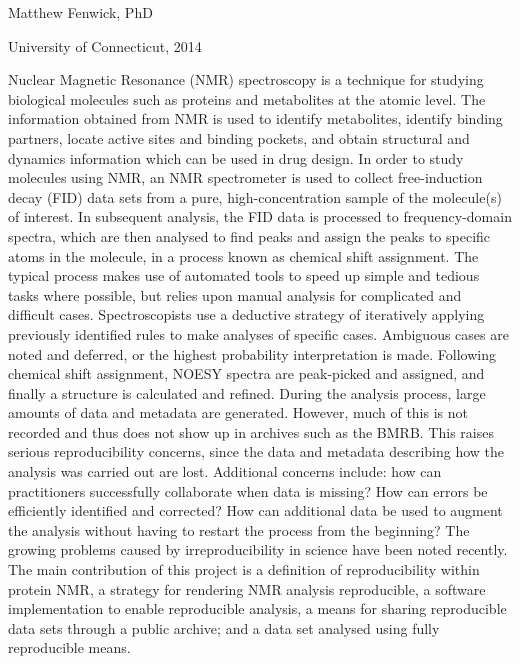 \begin{center}
  \mattftitle{}

  Matthew Fenwick, PhD

  University of Connecticut, 2014
\end{center}

\thispagestyle{empty}
Nuclear Magnetic Resonance (NMR) spectroscopy is a technique for studying 
biological molecules such as proteins and metabolites at the atomic level.  
The information obtained from NMR is used to identify metabolites, identify 
binding partners, locate active sites and binding pockets, and obtain 
structural and dynamics information which can be used in drug design.  In 
order to study molecules using NMR, an NMR spectrometer is used to collect 
free-induction decay (FID) data sets from a pure, high-concentration sample 
of the molecule(s) of interest.  In subsequent analysis, the FID data is 
processed to frequency-domain spectra, which are then analysed to find peaks 
and assign the peaks to specific atoms in the molecule, in a process known as 
chemical shift assignment.  The typical process makes use of automated tools to 
speed up simple and tedious tasks where possible, but relies upon manual 
analysis for complicated and difficult cases.  Spectroscopists use a deductive 
strategy of iteratively applying previously identified rules to make analyses 
of specific cases.  Ambiguous cases are noted and deferred, or the highest 
probability interpretation is made.  Following chemical shift assignment, 
NOESY spectra are peak-picked and assigned, and finally a structure is 
calculated and refined.  During the analysis process, large amounts of data 
and metadata are generated.  However, much of this is not recorded and thus 
does not show up in archives such as the BMRB.  This raises serious 
reproducibility concerns, since the data and metadata describing how the 
analysis was carried out are lost.  Additional concerns include: how can 
practitioners successfully collaborate when data is missing?  How can errors 
be efficiently identified and corrected?  How can additional data be used to 
augment the analysis without having to restart the process from the beginning?  
The growing problems caused by irreproducibility in science have been noted 
recently.  The main contribution of this project is a definition of 
reproducibility within protein NMR, a strategy for rendering NMR analysis 
reproducible, a software implementation to enable reproducible analysis, a 
means for sharing reproducible data sets through a public archive; and a data 
set analysed using fully reproducible means.

\thispagestyle{empty}

